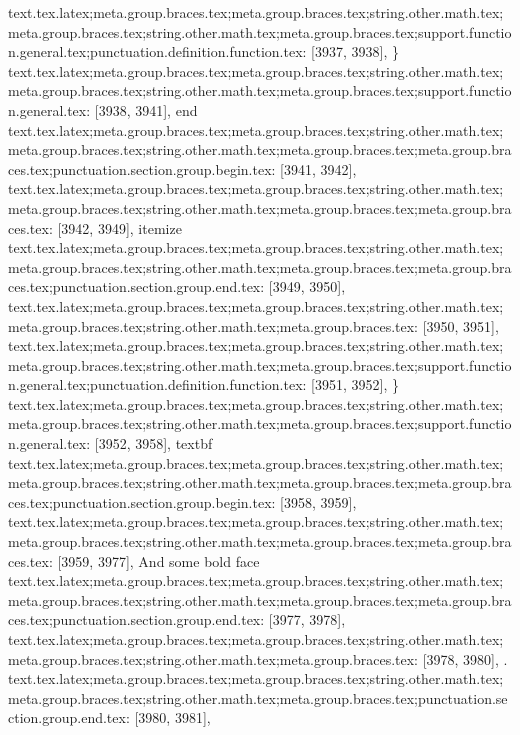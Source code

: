 {{{{{{{{{{{{{{{{{{{{{{{{{{{{{{{{{{{{{{{{{{{{{{{{{{{{{{{{{{{{{{{{{{{{{{{{{{{{{{{{{{{{{{{{{{{{{{{{{{{{{{{{{{{{{{{{{{{{{{{{{{{{{{}
text.tex.latex;meta.group.braces.tex;meta.group.braces.tex;string.other.math.tex;meta.group.braces.tex;string.other.math.tex;meta.group.braces.tex;support.function.general.tex;punctuation.definition.function.tex: [3937, 3938], {\}
text.tex.latex;meta.group.braces.tex;meta.group.braces.tex;string.other.math.tex;meta.group.braces.tex;string.other.math.tex;meta.group.braces.tex;support.function.general.tex: [3938, 3941], {end}
text.tex.latex;meta.group.braces.tex;meta.group.braces.tex;string.other.math.tex;meta.group.braces.tex;string.other.math.tex;meta.group.braces.tex;meta.group.braces.tex;punctuation.section.group.begin.tex: [3941, 3942], {{}
text.tex.latex;meta.group.braces.tex;meta.group.braces.tex;string.other.math.tex;meta.group.braces.tex;string.other.math.tex;meta.group.braces.tex;meta.group.braces.tex: [3942, 3949], {itemize}
text.tex.latex;meta.group.braces.tex;meta.group.braces.tex;string.other.math.tex;meta.group.braces.tex;string.other.math.tex;meta.group.braces.tex;meta.group.braces.tex;punctuation.section.group.end.tex: [3949, 3950], {}}
text.tex.latex;meta.group.braces.tex;meta.group.braces.tex;string.other.math.tex;meta.group.braces.tex;string.other.math.tex;meta.group.braces.tex: [3950, 3951], {
}
text.tex.latex;meta.group.braces.tex;meta.group.braces.tex;string.other.math.tex;meta.group.braces.tex;string.other.math.tex;meta.group.braces.tex;support.function.general.tex;punctuation.definition.function.tex: [3951, 3952], {\}
text.tex.latex;meta.group.braces.tex;meta.group.braces.tex;string.other.math.tex;meta.group.braces.tex;string.other.math.tex;meta.group.braces.tex;support.function.general.tex: [3952, 3958], {textbf}
text.tex.latex;meta.group.braces.tex;meta.group.braces.tex;string.other.math.tex;meta.group.braces.tex;string.other.math.tex;meta.group.braces.tex;meta.group.braces.tex;punctuation.section.group.begin.tex: [3958, 3959], {{}
text.tex.latex;meta.group.braces.tex;meta.group.braces.tex;string.other.math.tex;meta.group.braces.tex;string.other.math.tex;meta.group.braces.tex;meta.group.braces.tex: [3959, 3977], {And some bold face}
text.tex.latex;meta.group.braces.tex;meta.group.braces.tex;string.other.math.tex;meta.group.braces.tex;string.other.math.tex;meta.group.braces.tex;meta.group.braces.tex;punctuation.section.group.end.tex: [3977, 3978], {}}
text.tex.latex;meta.group.braces.tex;meta.group.braces.tex;string.other.math.tex;meta.group.braces.tex;string.other.math.tex;meta.group.braces.tex: [3978, 3980], {.
}
text.tex.latex;meta.group.braces.tex;meta.group.braces.tex;string.other.math.tex;meta.group.braces.tex;string.other.math.tex;meta.group.braces.tex;punctuation.section.group.end.tex: [3980, 3981], {}}
}}}}}}}}}}}}}}}}}}}}}}}}}}}}}}}}}}}}}}}}}}}}}}}}}}}}}}}}}}}}}}}}}}}}}}}}}}}}}}}}}}}}}}}}}}}}}}}}}}}}}}}}}}}}}}}}}}}}}}}}}}}}}}
